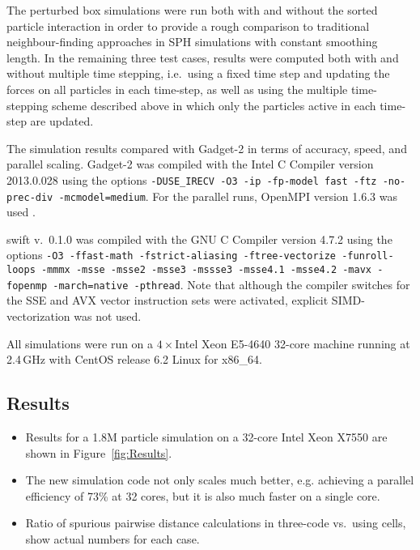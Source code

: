 \documentclass[final]{siamltex}
\newcommand{\fig}[1]
    {Figure~\ref{fig:#1}}
\newcommand{\swift}
    {{\sc swift}\xspace}
\begin{document}
The perturbed box simulations were run both with and without the
sorted particle interaction in order to provide a rough comparison
to traditional neighbour-finding approaches in SPH simulations with
constant smoothing length.
In the remaining three test cases, results were
computed both with and without multiple time stepping,
i.e.~using a fixed time step and updating the forces on all
particles in each time-step, as well as using the multiple
time-stepping scheme described above in which only the particles
active in each time-step are updated.

The simulation results compared with Gadget-2 \cite{ref:Springel2005}
in terms of accuracy, speed, and parallel scaling.
Gadget-2 was compiled with the Intel C Compiler version 2013.0.028
using the options {\tt -DUSE\_IRECV -O3 -ip -fp-model fast -ftz
-no-prec-div -mcmodel=medium}.
For the parallel runs, OpenMPI version 1.6.3 was used \cite{ref:Gabriel2004}.

\swift v.~0.1.0 was compiled with the GNU C Compiler version 4.7.2
using the options {\tt -O3 -ffast-math -fstrict-aliasing
-ftree-vectorize -funroll-loops -mmmx -msse -msse2 -msse3 -mssse3
-msse4.1 -msse4.2 -mavx -fopenmp -march=native -pthread}.
Note that although the compiler switches for the SSE and AVX
vector instruction sets were activated, explicit
SIMD-vectorization was not used.

All simulations were run on a $4\times$Intel Xeon E5-4640
32-core machine running at 2.4\,GHz with
CentOS release 6.2 Linux for x86\_64.


\subsection{Results}

\begin{itemize}

    \item Results for a 1.8M particle simulation on a 32-core Intel Xeon X7550
        are shown in \fig{Results}.
        
    \item The new simulation code not only scales much better, e.g. achieving
        a parallel efficiency of 73\% at 32 cores, but it is also much faster
        on a single core.
        
    \item Ratio of spurious pairwise distance calculations in three-code
        vs.~using cells, show actual numbers for each case.

\end{itemize}
\end{document}
